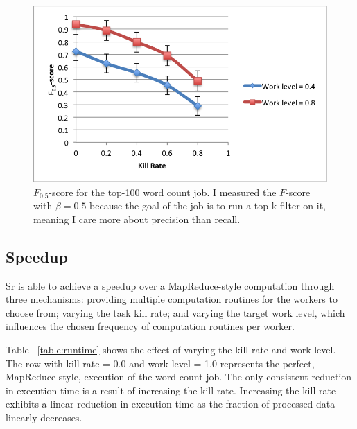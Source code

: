 \documentclass[12pt]{article}
\begin{document}
\begin{figure}
\includegraphics[width=\linewidth]{f-score.png}
\caption{$F_{0.5}$-score for the top-100 word count job. I measured the $F$-score with $\beta = 0.5$ because the goal of the job is to run a top-k filter on it, meaning I care more about precision than recall.}
\label{fig:fscore}
\end{figure}

\subsection{Speedup}
Sr is able to achieve a speedup over a MapReduce-style computation through three mechanisms: providing multiple computation routines for the workers to choose from; varying the task kill rate; and varying the target work level, which influences the chosen frequency of computation routines per worker.

Table ~\ref{table:runtime} shows the effect of varying the kill rate and work level. The row with kill rate = 0.0 and work level = 1.0 represents the perfect, MapReduce-style, execution of the word count job. The only consistent reduction in execution time is a result of increasing the kill rate. Increasing the kill rate exhibits a linear reduction in execution time as the fraction of processed data linearly decreases.
\end{document}
